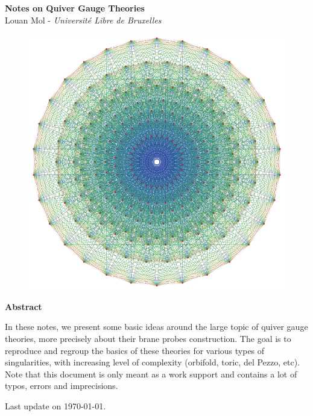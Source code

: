 
\begin{titlepage}


	\begin{center}

	{\Huge{\bfseries{Notes on Quiver Gauge Theories}}}\\[0.7cm]

	Louan Mol - \textit{Université Libre de Bruxelles}

    \vspace{1cm}

	\begin{figure}[H]
        \centering
        \includegraphics[scale=0.4]{Pictures/E8_graph.png}
    \end{figure}

    \vspace{2cm}
	
	{\large\textbf{Abstract}}
	\end{center}
	
	    \quad In these notes, we present some basic ideas around the large topic of quiver gauge theories, more precisely about their brane probes construction.  The goal is to reproduce and regroup the basics of these theories for various types of singularities, with increasing level of complexity (orbifold, toric, del Pezzo, etc). Note that this document is only meant as a work support and contains a lot of typos, errors and imprecisions.
	    
	\vfill

	Last update on \today.
	
\end{titlepage}